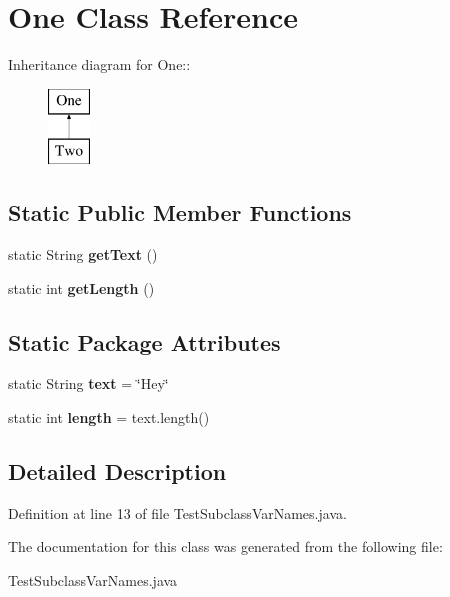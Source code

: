 \section{One Class Reference}
\label{classOne}
Inheritance diagram for One::\begin{figure}[H]
\begin{center}
\leavevmode
\includegraphics[height=2cm]{classOne}
\end{center}
\end{figure}
\subsection*{Static Public Member Functions}
\begin{CompactItemize}
\item 
static String {\bf get\-Text} ()\label{classOne_c400624dcb962b5eeb9f98630f48968e}

\item 
static int {\bf get\-Length} ()\label{classOne_e5dfb0ee9ca9b1b28c15d7bbf3fbea3f}

\end{CompactItemize}
\subsection*{Static Package Attributes}
\begin{CompactItemize}
\item 
static String {\bf text} = \char`\"{}Hey\char`\"{}\label{classOne_2443f2db7bdd17ccc5e650c3fd4e50ce}

\item 
static int {\bf length} = text.length()\label{classOne_a8e127d39c8e05f72c40f918c5290c2b}

\end{CompactItemize}


\subsection{Detailed Description}




Definition at line 13 of file Test\-Subclass\-Var\-Names.java.

The documentation for this class was generated from the following file:\begin{CompactItemize}
\item 
Test\-Subclass\-Var\-Names.java\end{CompactItemize}
